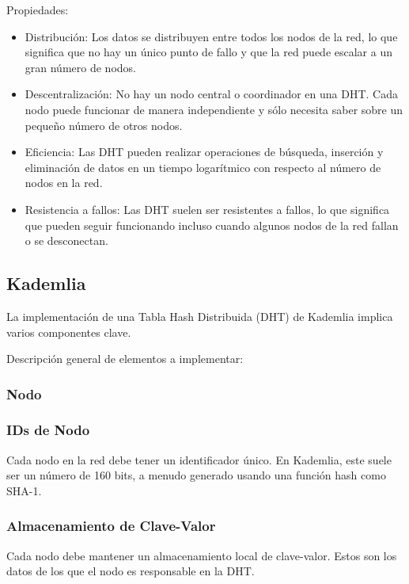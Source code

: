 \documentclass[10pt]{article} %
\begin{document}
	Propiedades:
	
	\begin{itemize}
		\item  Distribución: Los datos se distribuyen entre todos los nodos de la red, lo que significa que no hay un único punto de fallo y que la red puede escalar a un gran número de nodos.
		
		\item  Descentralización: No hay un nodo central o coordinador en una DHT. Cada nodo puede funcionar de manera independiente y sólo necesita saber sobre un pequeño número de otros nodos.
		
		\item  Eficiencia: Las DHT pueden realizar operaciones de búsqueda, inserción y eliminación de datos en un tiempo logarítmico con respecto al número de nodos en la red.
		
		\item Resistencia a fallos: Las DHT suelen ser resistentes a fallos, lo que significa que pueden seguir funcionando incluso cuando algunos nodos de la red fallan o se desconectan.
	\end{itemize}
	
	\subsection{Kademlia}
	
	La implementación de una Tabla Hash Distribuida (DHT) de Kademlia implica varios componentes clave. 
	
	Descripción general de elementos a implementar:
	
	\subsubsection{Nodo}
	
	\subsubsection{IDs de Nodo}
	
	Cada nodo en la red debe tener un identificador único. En Kademlia, este suele ser un número de 160 bits, a menudo generado usando una función hash como SHA-1.
	
	\subsubsection{Almacenamiento de Clave-Valor} 
	
	Cada nodo debe mantener un almacenamiento local de clave-valor. Estos son los datos de los que el nodo es responsable en la DHT.
	
\end{document}
